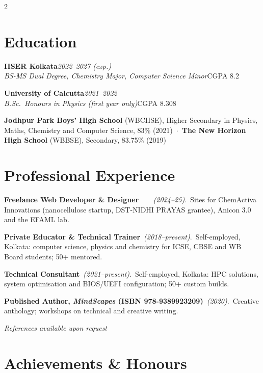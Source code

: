 \documentclass[a4paper,10.5pt]{extarticle}
\newcommand{\eduentry}[4]{%
  {\normalsize\textbf{#1}}\hfill{\small\itshape\textcolor{mutedtext}{#2}}\\[0.04em]
  {\small\itshape #3}\hfill{\small #4}\par\vspace{3pt}%
}
\newcommand{\proj}[3]{{\small\textbf{#1}~{\itshape\textcolor{mutedtext}{(#2)}}.\ #3}\par\vspace{2.8pt}}
\begin{document}
\begin{paracol}{2}
\section{Education}

\eduentry{IISER Kolkata}{2022--2027 (exp.)}{BS-MS Dual Degree, Chemistry Major, Computer Science Minor}{CGPA 8.2}

\eduentry{University of Calcutta}{2021--2022}{B.Sc.\ Honours in Physics (first year only)}{CGPA 8.308}

{\small\textbf{Jodhpur Park Boys' High School} (WBCHSE), Higher Secondary in Physics, Maths, Chemistry and Computer Science, 83\% (2021)~$\cdot$~\textbf{The New Horizon High School} (WBBSE), Secondary, 83.75\% (2019)}

\section{Professional Experience}

\proj{Freelance Web Developer \& Designer \href{https://chemactiva.com/}{\faGlobe}~\href{https://anicon3.github.io/}{\faGlobe}~\href{https://shuvam-banerji-seal.github.io/EFAML_WEB/index.html}{\faGlobe}}{2024--25}{Sites for ChemActiva Innovations (nanocellulose startup, DST-NIDHI PRAYAS grantee), Anicon 3.0 and the EFAML lab.}

\proj{Private Educator \& Technical Trainer}{2018--present}{Self-employed, Kolkata: computer science, physics and chemistry for ICSE, CBSE and WB Board students; 50+ mentored.}

\proj{Technical Consultant}{2021--present}{Self-employed, Kolkata: HPC solutions, system optimisation and BIOS/UEFI configuration; 50+ custom builds.}

\proj{Published Author, \textit{MindScapes} (ISBN 978-9389923209)}{2020}{Creative anthology; workshops on technical and creative writing.}

\begin{flushright}
{\small\itshape References available upon request}
\end{flushright}

\switchcolumn

\section{Achievements \& Honours}


\end{paracol}
\end{document}

